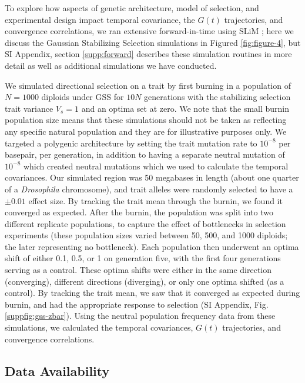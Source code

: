 \documentclass[9pt,twocolumn,twoside]{pnas-new}
\begin{document}
{To explore how aspects of genetic architecture, model of selection, and
experimental design impact temporal covariance, the $G(t)$ trajectories, and
convergence correlations, we ran extensive forward-in-time using SLiM
\cite{Haller2019-vu}; here we discuss the Gaussian Stabilizing Selection
simulations in Figured \ref{fig:figure-4}, but SI Appendix, section
\ref{supp:forward} describes these simulation routines in more detail as well
as additional simulations we have conducted.

We simulated directional selection on a trait by first burning in a population
of $N = 1000$ diploids under GSS for $10N$ generations with the stabilizing
selection trait variance $V_s = 1$ and an optima set at zero.  We note that the
small burnin population size means that these simulations should not be taken
as reflecting any specific natural population and they are for illustrative
purposes only.  We targeted a polygenic architecture by setting the trait
mutation rate to $10^{-8}$ per basepair, per generation, in addition to having
a separate neutral mutation of $10^{-8}$ which created neutral mutations which
we used to calculate the temporal covariances. Our simulated region was 50
megabases in length (about one quarter of a \emph{Drosophila} chromosome), and
trait alleles were randomly selected to have a $\pm 0.01$ effect size. By
tracking the trait mean through the burnin, we found it converged as expected.
After the burnin, the population was split into two different replicate
populations, to capture the effect of bottlenecks in selection experiments
(these population sizes varied between 50, 500, and 1000 diploids; the
later representing no bottleneck). Each population then underwent an optima
shift of either 0.1, 0.5, or 1 on generation five, with the first four
generations serving as a control. These optima shifts were either in the same
direction (converging), different directions (diverging), or only one optima
shifted (as a control). By tracking the trait mean, we saw that it converged as
expected during burnin, and had the appropriate response to selection
(SI Appendix, Fig. \ref{suppfig:gss-zbar}). Using the neutral
population frequency data from these simulations, we calculated the temporal
covariances, $G(t)$ trajectories, and convergence correlations.

\subsection*{Data Availability} 

}
\end{document}
